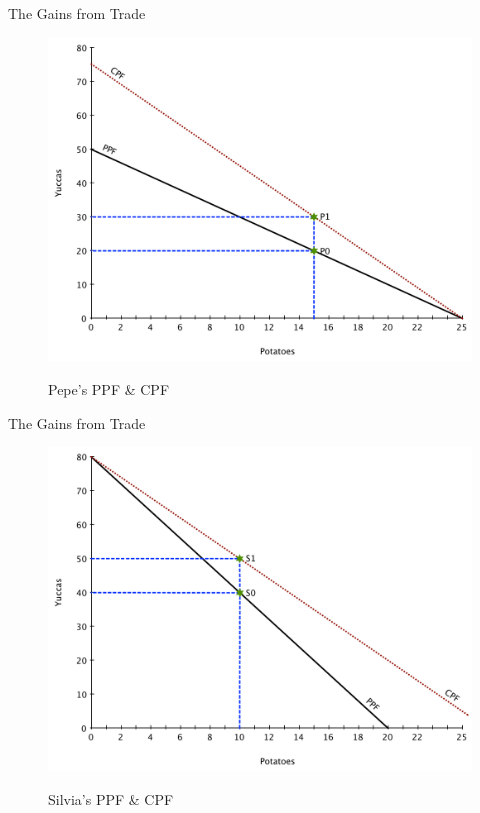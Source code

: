 \documentclass[xcolor={dvipsnames},pdf, hyperref={colorlinks=true, citecolor=ForestGreen, linkcolor=BlueViolet, urlcolor=Magenta}]{beamer}
\theoremstyle{definition}
\newcommand{\ddp}[1]{{\textcolor{ForestGreen}{#1}}}
\begin{document}
\begin{frame}[b]{The Gains from Trade}
	\begin{figure}[HB]
			\ddp{\includegraphics[scale=.35]{plot5.pdf}}
			\caption{Pepe's PPF \& CPF}
		\end{figure}
\end{frame}

\begin{frame}[b]{The Gains from Trade}
	\begin{figure}[HB]
		\ddp{\includegraphics[scale=.35]{plot6.pdf}}
		\caption{Silvia's PPF \& CPF}
	\end{figure}
\end{frame}
\end{document}

